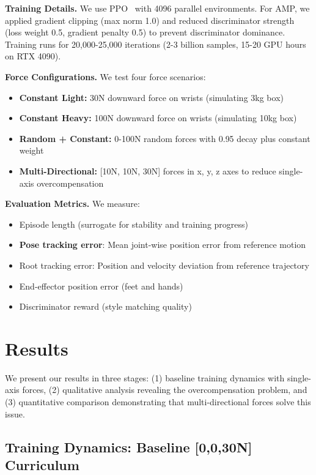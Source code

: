\documentclass{article}
\begin{document}
\textbf{Training Details.} We use PPO~\citep{schulman2017ppo} with 4096 parallel environments. For AMP, we applied gradient clipping (max norm 1.0) and reduced discriminator strength (loss weight 0.5, gradient penalty 0.5) to prevent discriminator dominance. Training runs for 20,000-25,000 iterations (2-3 billion samples, 15-20 GPU hours on RTX 4090).

\textbf{Force Configurations.} We test four force scenarios:
\begin{itemize}
\item \textbf{Constant Light:} 30N downward force on wrists (simulating 3kg box)
\item \textbf{Constant Heavy:} 100N downward force on wrists (simulating 10kg box)
\item \textbf{Random + Constant:} 0-100N random forces with 0.95 decay plus constant weight
\item \textbf{Multi-Directional:} [10N, 10N, 30N] forces in x, y, z axes to reduce single-axis overcompensation
\end{itemize}

\textbf{Evaluation Metrics.} We measure:
\begin{itemize}
\item Episode length (surrogate for stability and training progress)
\item \textbf{Pose tracking error}: Mean joint-wise position error from reference motion
\item Root tracking error: Position and velocity deviation from reference trajectory
\item End-effector position error (feet and hands)
\item Discriminator reward (style matching quality)
\end{itemize}

\section{Results}
\label{sec:results}

We present our results in three stages: (1) baseline training dynamics with single-axis forces, (2) qualitative analysis revealing the overcompensation problem, and (3) quantitative comparison demonstrating that multi-directional forces solve this issue.

\subsection{Training Dynamics: Baseline [0,0,30N] Curriculum}
\end{document}
